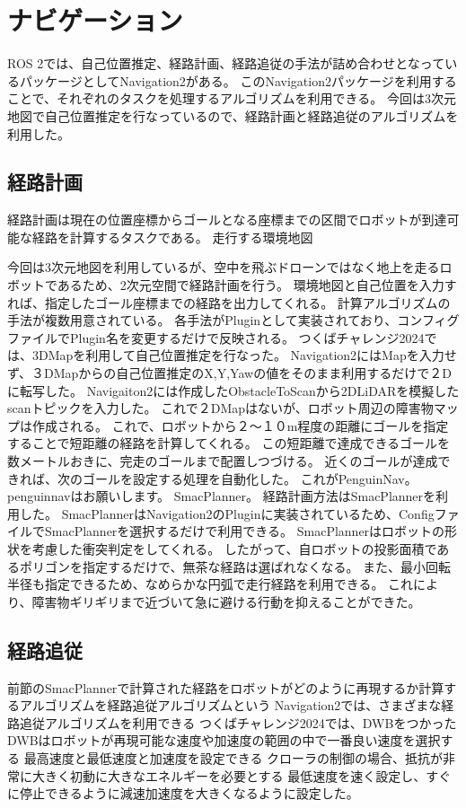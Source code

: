 \section{ナビゲーション}
ROS 2では、自己位置推定、経路計画、経路追従の手法が詰め合わせとなっているパッケージとしてNavigation2がある。
このNavigation2パッケージを利用することで、それぞれのタスクを処理するアルゴリズムを利用できる。
今回は3次元地図で自己位置推定を行なっているので、経路計画と経路追従のアルゴリズムを利用した。

\subsection{経路計画}
経路計画は現在の位置座標からゴールとなる座標までの区間でロボットが到達可能な経路を計算するタスクである。
走行する環境地図


今回は3次元地図を利用しているが、空中を飛ぶドローンではなく地上を走るロボットであるため、2次元空間で経路計画を行う。
環境地図と自己位置を入力すれば、指定したゴール座標までの経路を出力してくれる。
計算アルゴリズムの手法が複数用意されている。
各手法がPluginとして実装されており、コンフィグファイルでPlugin名を変更するだけで反映される。
つくばチャレンジ2024では、3DMapを利用して自己位置推定を行なった。
Navigation2にはMapを入力せず、３DMapからの自己位置推定のX,Y,Yawの値をそのまま利用するだけで２Dに転写した。
Navigaiton2には作成したObstacleToScanから2DLiDARを模擬したscanトピックを入力した。
これで２DMapはないが、ロボット周辺の障害物マップは作成される。
これで、ロボットから２〜１０m程度の距離にゴールを指定することで短距離の経路を計算してくれる。
この短距離で達成できるゴールを数メートルおきに、完走のゴールまで配置しつづける。
近くのゴールが達成できれば、次のゴールを設定する処理を自動化した。
これがPenguinNav。
penguinnavはお願いします。
SmacPlanner。
経路計画方法はSmacPlannerを利用した。
SmacPlannerはNavigation2のPluginに実装されているため、ConfigファイルでSmacPlannerを選択するだけで利用できる。
SmacPlannerはロボットの形状を考慮した衝突判定をしてくれる。
したがって、自ロボットの投影面積であるポリゴンを指定するだけで、無茶な経路は選ばれなくなる。
また、最小回転半径も指定できるため、なめらかな円弧で走行経路を利用できる。
これにより、障害物ギリギリまで近づいて急に避ける行動を抑えることができた。

\subsection{経路追従}
前節のSmacPlannerで計算された経路をロボットがどのように再現するか計算するアルゴリズムを経路追従アルゴリズムという
Navigation2では、さまざまな経路追従アルゴリズムを利用できる
つくばチャレンジ2024では、DWBをつかった
DWBはロボットが再現可能な速度や加速度の範囲の中で一番良い速度を選択する
最高速度と最低速度と加速度を設定できる
クローラの制御の場合、抵抗が非常に大きく初動に大きなエネルギーを必要とする
最低速度を速く設定し、すぐに停止できるように減速加速度を大きくなるように設定した。